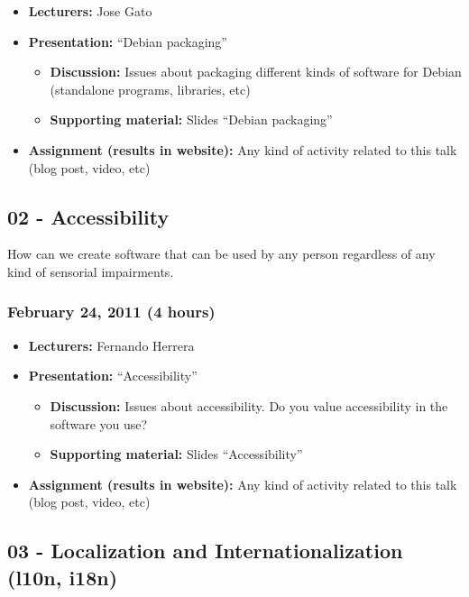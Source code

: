 \documentclass[a4paper]{article}
\begin{document}
\begin{itemize}
\item \textbf{Lecturers:} Jose Gato
\item \textbf{Presentation:} ``Debian packaging''
  \begin{itemize}
  \item \textbf{Discussion:} Issues about packaging different kinds of
    software for Debian (standalone programs, libraries, etc)
  \item \textbf{Supporting material:} Slides ``Debian packaging''
  \end{itemize}
\item \textbf{Assignment (results in website):} Any kind of activity
  related to this talk (blog post, video, etc)
\end{itemize}


\subsection{02 - Accessibility}

 How can we create software that can be used by any person regardless
of any kind of sensorial impairments. 

\subsubsection{February 24, 2011 (4 hours)}

\begin{itemize}
\item \textbf{Lecturers:} Fernando Herrera
\item \textbf{Presentation:} ``Accessibility''
  \begin{itemize}
  \item \textbf{Discussion:} Issues about accessibility. Do you value
    accessibility in the software you use?
  \item \textbf{Supporting material:} Slides ``Accessibility''
  \end{itemize}
\item \textbf{Assignment (results in website):} Any kind of activity
  related to this talk (blog post, video, etc)
\end{itemize}


\subsection{03 - Localization and Internationalization (l10n, i18n)}
\end{document}
